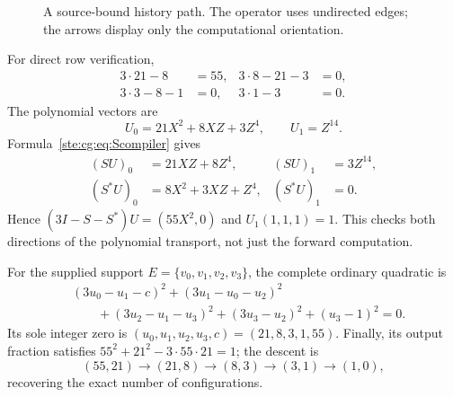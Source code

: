 \documentclass[11pt,letterpaper]{article}
\theoremstyle{definition}
\theoremstyle{remark}
\begin{document}
\begin{figure}[ht]
\centering
{}
\caption{A source-bound history path. The operator uses undirected edges;
the arrows display only the computational orientation.}
\label{ste:cg:fig:example}
\end{figure}

For direct row verification,
\begin{align*}
 3\cdot21-8&=55,&3\cdot8-21-3&=0,\\
 3\cdot3-8-1&=0,&3\cdot1-3&=0.
\end{align*}
The polynomial vectors are
\begin{equation}\label{ste:cg:eq:examplepoly}
 U_0=21X^2+8XZ+3Z^4,\qquad U_1=Z^{14}.
\end{equation}
Formula~\eqref{ste:cg:eq:Scompiler} gives
\begin{align*}
 (SU)_0&=21XZ+8Z^4,&(SU)_1&=3Z^{14},\\
 (S^*U)_0&=8X^2+3XZ+Z^4,&(S^*U)_1&=0.
\end{align*}
Hence $(3I-S-S^*)U=(55X^2,0)$ and $U_1(1,1,1)=1$.
This checks both directions of the polynomial transport, not just the
forward computation.

For the supplied support $E=\{v_0,v_1,v_2,v_3\}$, the complete ordinary
quadratic is
\begin{equation}\label{ste:cg:eq:examplequadratic}
 \begin{split}
 &(3u_0-u_1-c)^2+(3u_1-u_0-u_2)^2\\
 &\qquad +(3u_2-u_1-u_3)^2+(3u_3-u_2)^2+(u_3-1)^2=0.
 \end{split}
\end{equation}
Its sole integer zero is $(u_0,u_1,u_2,u_3,c)=(21,8,3,1,55)$.
Finally, its output fraction satisfies
$55^2+21^2-3\cdot55\cdot21=1$; the descent is
\[
 (55,21)\to(21,8)\to(8,3)\to(3,1)\to(1,0),
\]
recovering the exact number of configurations.
\end{document}

